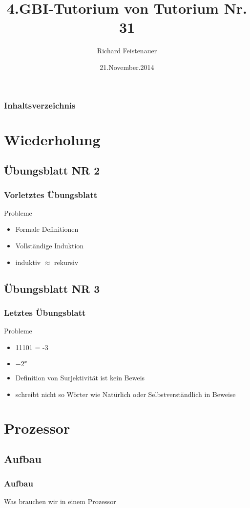\documentclass{beamer}
\author{Richard Feistenauer}
\title{4.GBI-Tutorium von Tutorium Nr. 31}
\date{21.November.2014}
\begin{document}
\begin{frame}
	\titlepage
\end{frame}

\begin{frame}
	\frametitle {Inhaltsverzeichnis}
	\tableofcontents
\end{frame}

\section{Wiederholung}
\subsection{Übungsblatt NR 2}
\begin{frame}
	\frametitle{Vorletztes \"Ubungsblatt}
	\begin{block}{Probleme}
		\begin{itemize}
			\item Formale Definitionen
			\item Vollständige Induktion
			\item induktiv $\approx$ rekursiv
		\end{itemize}
	\end{block}
\end{frame}

\subsection{Übungsblatt NR 3}
\begin{frame}
	\frametitle{Letztes \"Ubungsblatt}
	\begin{block}{Probleme}
		\begin{itemize}
			\item 11101 = -3
			\item $-2^x$
			\item Definition von Surjektivität ist kein Beweis
			\item schreibt nicht so Wörter wie Natürlich oder 						Selbstverständlich in Beweise
		\end{itemize}
	\end{block}
\end{frame}

\section{Prozessor}
\subsection{Aufbau}
\begin{frame}
	\frametitle{Aufbau}
	\begin{block}{}
		Was brauchen wir in einem Prozessor
	\end{block}
\end{frame}
\end{document}
